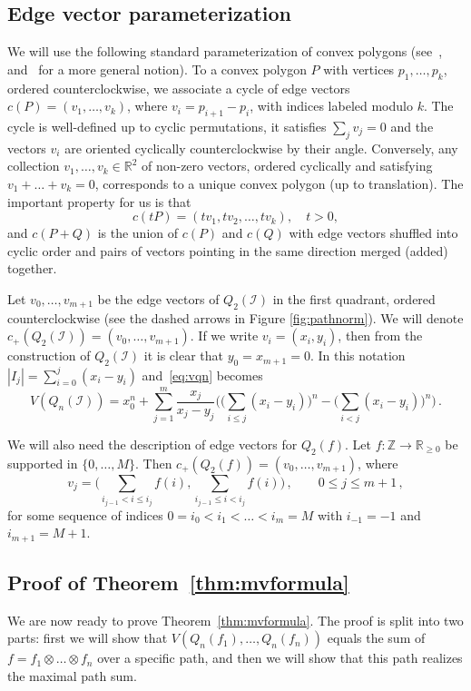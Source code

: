 \documentclass[a4paper,reqno,12pt]{amsart}
\newcommand{\I}{\mathscr{I}}
\newcommand{\z}{\mathbb{Z}}
\renewcommand{\r}{\mathbb{R}}
\newcommand{\1}{\bo{1}}
\begin{document}
\subsection{Edge vector parameterization}
We will use the following standard parameterization of convex polygons (see~\cite[\S27]{Lyu}, and~\cite[Ch.4]{Sch} for a more general notion). To a convex polygon $P$ with vertices $p_1,\dots,p_k$, ordered counterclockwise, we associate a cycle of edge vectors $c(P)=(v_1,\dots,v_k)$, where $v_i=p_{i+1}-p_i$, with indices labeled modulo $k$. The cycle is well-defined up to cyclic permutations, it satisfies $\sum_{j}v_j=0$ and the vectors $v_i$ are oriented cyclically counterclockwise by their angle. Conversely, any collection $v_1,\dots,v_k\in\r^2$ of non-zero vectors, ordered cyclically and satisfying $v_1+\dots+v_k=0$, corresponds to a unique convex polygon (up to translation). The important property for us is that
	\[c(tP) = (tv_1,tv_2,\dots,tv_k) ,\quad t>0,\]
and $c(P+Q)$ is the union of $c(P)$ and $c(Q)$ with edge vectors shuffled into cyclic order and pairs of vectors pointing in the same direction merged (added) together.

Let $v_0,\dots,v_{m+1}$ be the edge vectors of $Q_2(\I)$ in the first quadrant, ordered counterclockwise (see the dashed arrows in Figure \ref{fig:pathnorm}). We will denote $c_+(Q_2(\I))=(v_0,\dots,v_{m+1})$. If we write $v_i=(x_i,y_i)$, then from the construction of $Q_2(\I)$ it is clear that $y_0=x_{m+1}=0$. In this notation $|I_j|=\sum_{i=0}^{j}(x_{i}-y_{i})$ and~\eqref{eq:vqn} becomes
\begin{equation} \label{eq:vqn2}
	V(Q_n(\I)) = x_{0}^n
	+ \sum_{j=1}^{m}\frac{x_{j}}{x_{j}-y_{j}}\Big(\big(\sum_{i\le j}(x_{i}-y_{i})\big)^n-\big(\sum_{i<j}(x_{i}-y_{i})\big)^n\Big)\,.
\end{equation}

We will also need the description of edge vectors for $Q_2(f)$.
Let $f\colon\z\to\r_{\ge0}$ be supported in $\{0,\dots,M\}$. Then $c_{+}(Q_2(f))=(v_0,\dots,v_{m+1})$, where
\begin{equation} \label{eq:q2f_sides}
	v_j = \Big(\sum_{i_{j-1}<i\le i_j}f(i),\sum_{i_{j-1}\le i<i_{j}}f(i)\Big)\,,
	\qquad 0\le j\le m+1\,,
\end{equation}
for some sequence of indices $0=i_0<i_1<\dots<i_m=M$ with $i_{-1}=-1$ and $i_{m+1}=M+1$.

\subsection{Proof of Theorem~\ref{thm:mvformula}}
We are now ready to prove Theorem~\ref{thm:mvformula}. The proof is split into two parts: first we will show that $V(Q_n(f_1),\dots,Q_n(f_n))$ equals the sum of $f=f_1\otimes\dots\otimes f_n$ over a specific path, and then we will show that this path realizes the maximal path sum. 
\end{document}
